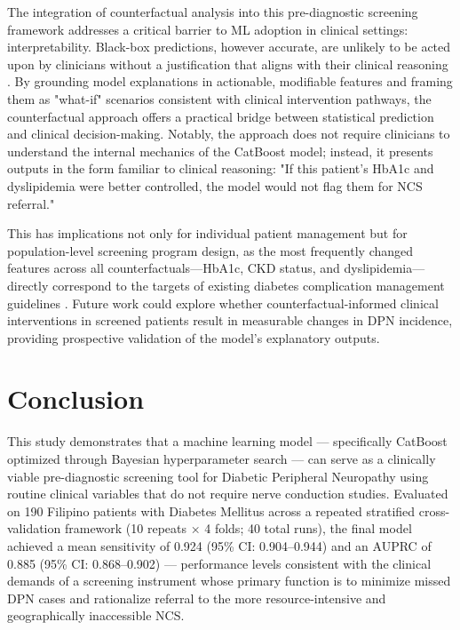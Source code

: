 \documentclass[pdflatex,sn-vancouver-num]{sn-jnl}
\begin{document}
The integration of counterfactual analysis into this pre-diagnostic screening framework addresses a critical barrier to ML adoption in clinical settings: interpretability. Black-box predictions, however accurate, are unlikely to be acted upon by clinicians without a justification that aligns with their clinical reasoning \cite{rudin2019}. By grounding model explanations in actionable, modifiable features and framing them as "what-if" scenarios consistent with clinical intervention pathways, the counterfactual approach offers a practical bridge between statistical prediction and clinical decision-making. Notably, the approach does not require clinicians to understand the internal mechanics of the CatBoost model; instead, it presents outputs in the form familiar to clinical reasoning: "If this patient's HbA1c and dyslipidemia were better controlled, the model would not flag them for NCS referral."

This has implications not only for individual patient management but for population-level screening program design, as the most frequently changed features across all counterfactuals—HbA1c, CKD status, and dyslipidemia—directly correspond to the targets of existing diabetes complication management guidelines \cite{ada2024}. Future work could explore whether counterfactual-informed clinical interventions in screened patients result in measurable changes in DPN incidence, providing prospective validation of the model's explanatory outputs.

\section{Conclusion}
This study demonstrates that a machine learning model — specifically CatBoost optimized through Bayesian hyperparameter search — can serve as a clinically viable pre-diagnostic screening tool for Diabetic Peripheral Neuropathy using routine clinical variables that do not require nerve conduction studies. Evaluated on 190 Filipino patients with Diabetes Mellitus across a repeated stratified cross-validation framework (10 repeats × 4 folds; 40 total runs), the final model achieved a mean sensitivity of 0.924 (95\% CI: 0.904–0.944) and an AUPRC of 0.885 (95\% CI: 0.868–0.902) — performance levels consistent with the clinical demands of a screening instrument whose primary function is to minimize missed DPN cases and rationalize referral to the more resource-intensive and geographically inaccessible NCS.
\end{document}
